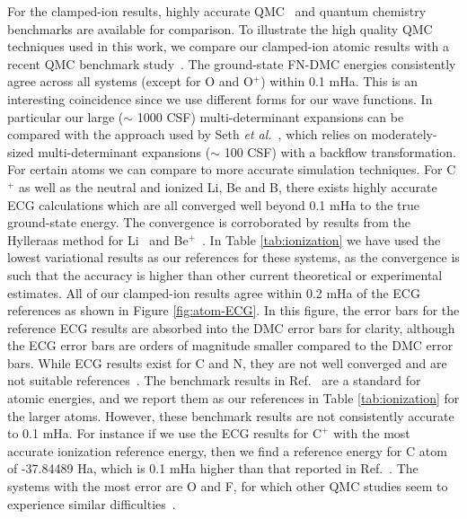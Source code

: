 \documentclass[pra,superscriptaddress,groupedaddress,twocolumn]{revtex4}
\begin{document}
For the clamped-ion results, highly accurate QMC~\cite{Brown_Bench,Toulouse_Bench,Seth_Bench,Morale_Bench,Rappe_Bench} and quantum chemistry benchmarks are available for comparison. To illustrate the high quality QMC techniques used in this work, we compare our clamped-ion atomic results with a recent QMC benchmark study~\cite{Seth_Bench}. The ground-state FN-DMC energies consistently agree across all systems (except for O and O$^{+}$) within 0.1 mHa. This is an interesting coincidence since we use different forms for our wave functions. In particular our large ($\sim$ 1000 CSF) multi-determinant expansions can be compared with the approach used by Seth {\it et al.}~\cite{Seth_Bench}, which relies on moderately-sized multi-determinant expansions ($\sim$ 100 CSF) with a backflow transformation. For certain atoms we can compare to more accurate simulation techniques. For C$^+$ as well as the neutral and ionized Li, Be and B, there exists highly accurate ECG calculations which are all converged well beyond 0.1 mHa to the true ground-state energy. The convergence is corroborated by results from the Hylleraas method for Li~\cite{Wang_Li} and Be$^+$~\cite{Puchalski_Be+}. In Table \ref{tab:ionization} we have used the lowest variational results as our references for these systems, as the convergence is such that the accuracy is higher than other current theoretical or experimental estimates. All of our clamped-ion results agree within 0.2 mHa of the ECG references as shown in Figure \ref{fig:atom-ECG}. In this figure, the error bars for the reference ECG results are absorbed into the DMC error bars for clarity, although the ECG error bars are orders of magnitude smaller compared to the DMC error bars. While ECG results exist for C and N, they are not well converged and are not suitable references~\cite{Bubin_C,Sharkey_N}. The benchmark results in Ref.~\cite{Davidson_Atoms} are a standard for atomic energies, and we report them as our references in Table \ref{tab:ionization} for the larger atoms. However, these benchmark results are not consistently accurate to 0.1 mHa. For instance if we use the ECG results for $\text{C}^+$ with the most accurate ionization reference energy, then we find a reference energy for C atom of -37.84489 Ha, which is 0.1 mHa higher than that reported in Ref.~\cite{Davidson_Atoms}. %
The systems with the most error are O and F, for which other QMC studies seem to experience similar difficulties~\cite{Seth_Bench,Booth_FCIQMC,Brown_Bench}.
\end{document}
